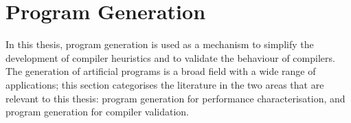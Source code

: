 %
%
%
%
%


\section{Program Generation}
\label{sec:related-work-generation}

In this thesis, program generation is used as a mechanism to simplify the development of compiler heuristics and to validate the behaviour of compilers. The generation of artificial programs is a broad field with a wide range of applications; this section categorises the literature in the two areas that are relevant to this thesis: program generation for performance characterisation, and program generation for compiler validation.

